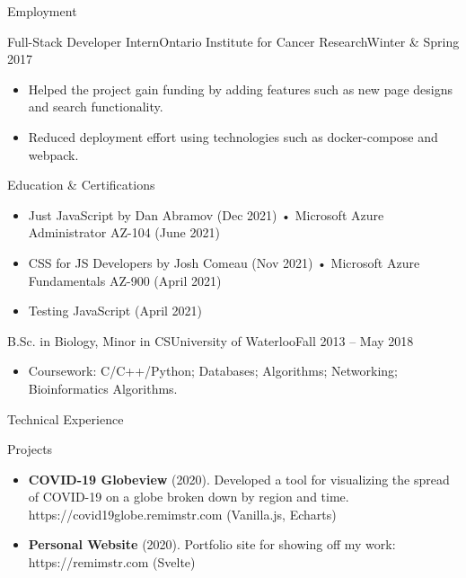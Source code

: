 \documentclass[]{mcdowellcv}
\begin{document}
\begin{cvsection}{Employment}
		\begin{cvsubsection}{Full-Stack Developer Intern}{Ontario Institute for Cancer Research}{Winter \& Spring 2017}
			\begin{itemize}
				\item Helped the project gain funding by adding features such as new page designs and search functionality.
				\item Reduced deployment effort using technologies such as docker-compose and webpack.
			\end{itemize}
		\end{cvsubsection}
	\end{cvsection}

	\begin{cvsection}{Education \& Certifications}
		\begin{cvsubsection}{}{}{}
			\begin{itemize}
			    \item Just JavaScript by Dan Abramov (Dec 2021)  \hspace{1.41cm} • Microsoft Azure Administrator AZ-104 (June 2021)
			    \item CSS for JS Developers by Josh Comeau (Nov 2021) \hspace{0.25cm} • Microsoft Azure Fundamentals AZ-900 (April 2021)
				\item Testing JavaScript (April 2021)
			\end{itemize}
		\end{cvsubsection}
		\begin{cvsubsection}{B.Sc. in Biology, Minor in CS}{University of Waterloo}{Fall 2013 -- May 2018}
			\begin{itemize}
				\item Coursework: C/C++/Python; Databases; Algorithms; Networking; Bioinformatics Algorithms.
			\end{itemize}
		\end{cvsubsection}
	\end{cvsection}

	\begin{cvsection}{Technical Experience}
		\begin{cvsubsection}{Projects}{}{}
			\begin{itemize}
				\item \textbf{COVID-19 Globeview} (2020). Developed a tool for visualizing the spread of COVID-19 on a globe broken down by region and time.
					https://covid19globe.remimstr.com (Vanilla.js, Echarts)
				\item \textbf{Personal Website} (2020). Portfolio site for showing off my work: https://remimstr.com (Svelte)
			\end{itemize}
		\end{cvsubsection}
	\end{cvsection}
\end{document}
